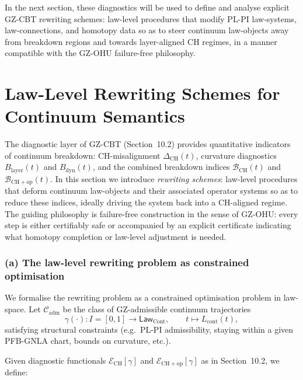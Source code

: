 \documentclass[11pt]{book}
\theoremstyle{plain}
\theoremstyle{definition}
\begin{document}
In the next section, these diagnostics will be used to define and
analyse explicit GZ-CBT rewriting schemes: law-level procedures that
modify PL-PI law-systems, law-connections, and homotopy data so as to
steer continuum law-objects away from breakdown regions and towards
layer-aligned CH regimes, in a manner compatible with the GZ-OHU
failure-free philosophy.



\section{Law-Level Rewriting Schemes for Continuum Semantics}


The diagnostic layer of GZ-CBT (Section~10.2) provides quantitative
indicators of continuum breakdown: CH-misalignment
$\Delta_{\mathrm{CH}}(t)$, curvature diagnostics $B_{\mathrm{layer}}(t)$
and $B_{\mathrm{dyn}}(t)$, and the combined breakdown indices
$\mathcal{B}_{\mathrm{CH}}(t)$ and $\mathcal{B}_{\mathrm{CH+op}}(t)$.
In this section we introduce \emph{rewriting schemes}: law-level
procedures that deform continuum law-objects and their associated
operator systems so as to reduce these indices, ideally driving the
system back into a CH-aligned regime. The guiding philosophy is
failure-free construction in the sense of GZ-OHU: every step is
either certifiably safe or accompanied by an explicit certificate
indicating what homotopy completion or law-level adjustment is needed.



\subsubsection*{(a) The law-level rewriting problem as constrained optimisation}

We formalise the rewriting problem as a constrained optimisation problem
in law-space. Let $\mathcal{C}_{\mathrm{adm}}$ be the class of
GZ-admissible continuum trajectories
\[
  \gamma(\cdot): I=[0,1]\to\mathsf{Law}_{\mathrm{Cont}},
  \qquad
  t\mapsto L_{\mathrm{cont}}(t),
\]
satisfying structural constraints (e.g.\ PL-PI admissibility, staying
within a given PFB-GNLA chart, bounds on curvature, etc.).

Given diagnostic functionals
$\mathcal{E}_{\mathrm{CH}}[\gamma]$ and
$\mathcal{E}_{\mathrm{CH+op}}[\gamma]$ as in Section~10.2, we define:
\end{document}
